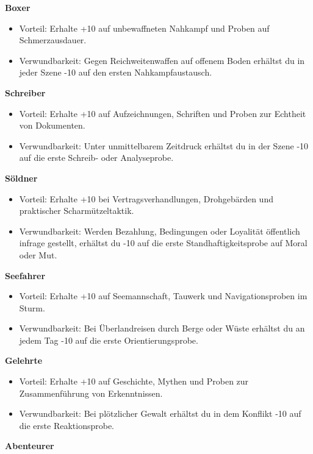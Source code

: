 \noindent\textbf{Boxer}\par
\begin{itemize}[leftmargin=*,nosep]
\item Vorteil: Erhalte +10 auf unbewaffneten Nahkampf und Proben auf Schmerzausdauer.
\item Verwundbarkeit: Gegen Reichweitenwaffen auf offenem Boden erhältst du in jeder Szene -10 auf den ersten Nahkampfaustausch.
\end{itemize}
\noindent\textbf{Schreiber}\par
\begin{itemize}[leftmargin=*,nosep]
\item Vorteil: Erhalte +10 auf Aufzeichnungen, Schriften und Proben zur Echtheit von Dokumenten.
\item Verwundbarkeit: Unter unmittelbarem Zeitdruck erhältst du in der Szene -10 auf die erste Schreib- oder Analyseprobe.
\end{itemize}
\noindent\textbf{Söldner}\par
\begin{itemize}[leftmargin=*,nosep]
\item Vorteil: Erhalte +10 bei Vertragsverhandlungen, Drohgebärden und praktischer Scharmützeltaktik.
\item Verwundbarkeit: Werden Bezahlung, Bedingungen oder Loyalität öffentlich infrage gestellt, erhältst du -10 auf die erste Standhaftigkeitsprobe auf Moral oder Mut.
\end{itemize}
\noindent\textbf{Seefahrer}\par
\begin{itemize}[leftmargin=*,nosep]
\item Vorteil: Erhalte +10 auf Seemannschaft, Tauwerk und Navigationsproben im Sturm.
\item Verwundbarkeit: Bei Überlandreisen durch Berge oder Wüste erhältst du an jedem Tag -10 auf die erste Orientierungsprobe.
\end{itemize}
\noindent\textbf{Gelehrte}\par
\begin{itemize}[leftmargin=*,nosep]
\item Vorteil: Erhalte +10 auf Geschichte, Mythen und Proben zur Zusammenführung von Erkenntnissen.
\item Verwundbarkeit: Bei plötzlicher Gewalt erhältst du in dem Konflikt -10 auf die erste Reaktionsprobe.
\end{itemize}
\noindent\textbf{Abenteurer}\par
